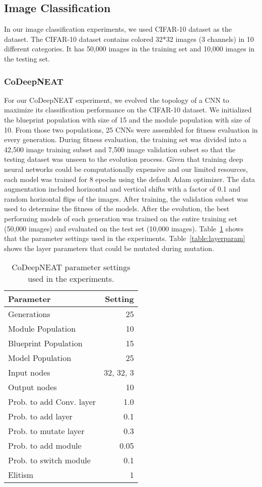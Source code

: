 \documentclass[11pt]{article}
\begin{document}
\subsection{Image Classification}
In our image classification experiments, we used CIFAR-10 dataset as the dataset. The CIFAR-10 dataset contains colored 32*32 images (3 channels) in 10 different categories. It has 50,000 images in the training set and 10,000 images in the testing set.

\subsubsection{CoDeepNEAT}
For our CoDeepNEAT experiment, we evolved the topology of a CNN to maximize its classification performance on the CIFAR-10 dataset. We initialized the blueprint population with size of 15 and the module population with size of 10. From those two populations, 25 CNNs were assembled for fitness evaluation in every generation. During fitness evaluation, the training set was divided into a 42,500 image training subset and 7,500 image validation subset so that the testing dataset was unseen to the evolution process. Given that training deep neural networks could be computationally expensive and our limited resources, each model was trained for 8 epochs using the default Adam optimizer. The data augmentation included horizontal and vertical shifts with a factor of 0.1 and random horizontal flips of the images. After training, the validation subset was used to determine the fitness of the models. After the evolution, the best performing models of each generation was trained on the entire training set (50,000 images) and evaluated on the test set (10,000 images). Table~\ref{table:param} shows that the parameter settings used in the experiments. Table~\ref{table:layerparam} shows the layer parameters that could be mutated during mutation.

\begin{table}[h]
\begin{center}
\begin{tabular}{|l|r|} \hline
{\bf Parameter} & {\bf Setting} \\ \hline
Generations & 25 \\
Module Population & 10 \\
Blueprint Population & 15 \\
Model Population & 25 \\
Input nodes & 32, 32, 3 \\
Output nodes & 10 \\
Prob. to add Conv. layer & 1.0 \\
Prob. to add layer & 0.1 \\
Prob. to mutate layer & 0.3 \\
Prob. to add module & 0.05 \\
Prob. to switch module & 0.1 \\
Elitism & 1 \\ \hline

\end{tabular}
\caption{CoDeepNEAT parameter settings used in the experiments.}
\label{table:param}
\end{center}
\end{table}
\end{document}
